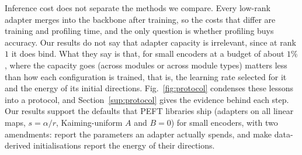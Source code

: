 \documentclass[conference]{IEEEtran}
\begin{document}
Inference cost does not separate the methods we compare. Every low-rank adapter
merges into the backbone after training, so the costs that differ are training
and profiling time, and the only question is whether profiling buys accuracy.
Our results do not say that adapter capacity is irrelevant, since at rank $1$ it
does bind. What they say is that, for small encoders at a budget of about $1\%$,
where the capacity goes (across modules or across module types) matters less
than how each configuration is trained, that is, the learning rate selected for
it and the energy of its initial directions. Fig.~\ref{fig:protocol} condenses
these lessons into a protocol, and Section~\ref{sup:protocol} gives the evidence
behind each step. Our results support the defaults that PEFT libraries ship
(adapters on all linear maps, $s = \alpha/r$, Kaiming-uniform $A$ and $B = 0$)
for small encoders, with two amendments: report the parameters an adapter
actually spends, and make data-derived initialisations report the energy of
their directions.
\end{document}
